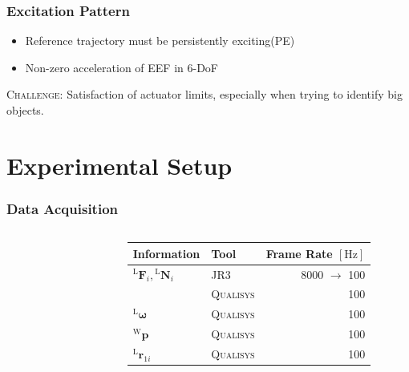 \documentclass[student,noshadow]{ITRslides}
\renewcommand{\vec}[1]{\boldsymbol{#1}}
\renewcommand{\vec}[1]{\boldsymbol{#1}}
\newcommand{\scr}[1]{\mathrm{#1}}
\begin{document}
\begin{frame}
	\frametitle{Excitation Pattern}
	\vspace{1cm}	
	\begin{itemize}
		\item Reference trajectory must be persistently exciting(PE)
		\item Non-zero acceleration of EEF in 6-DoF \cite{literaturstelle3}
	\end{itemize}
	\vspace{1cm}
	\textsc{Challenge}: Satisfaction of actuator limits, especially when trying to identify big objects.
\end{frame}

\section{Experimental Setup}
\begin{frame}
	\frametitle{Data Acquisition}
	\begin{columns}
		\begin{column}{0.35\textwidth}
			\begin{figure}
				\centering
				
			\end{figure}	
		\end{column}
		\begin{column}{0.65\textwidth}
			\begin{tabular}{llr}
				\toprule
				Information                                   & Tool              & Frame Rate $\left[\mathrm{Hz}\right]$ \\
				\midrule
				${^\scr{L}}\vec{F}_{i},{^\scr{L}}\vec{N}_{i}$ & \textsc{JR3}      & 8000 $\rightarrow$ 100                \\
				                                              & \textsc{Qualisys} & 100                                   \\
				$^\scr{L}\vec{\omega}$                        & \textsc{Qualisys} & 100                                   \\
				$^\scr{W}\vec{p}$                             & \textsc{Qualisys} & 100                                   \\
				$^\scr{L}\vec{r}_{1i}$                        & \textsc{Qualisys} & 100                                   \\
				\bottomrule
			\end{tabular}
		\end{column}
	\end{columns}
\end{frame}
\end{document}
